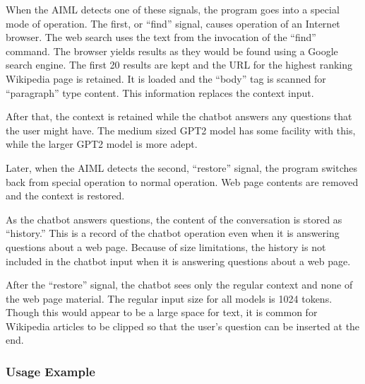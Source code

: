 When the AIML detects one of these signals, the program goes into a special mode of operation. The first, or ``find'' signal, causes operation of an Internet browser. The web search uses the text from the invocation of the ``find'' command. The browser yields results as they would be found using a Google search engine. The first 20 results are kept and the URL for the highest ranking Wikipedia page is retained. It is loaded and the ``body'' tag is scanned for ``paragraph'' type content. This information replaces the context input. 

After that, the context is retained while the chatbot answers any questions that the user might have. The medium sized GPT2 model has some facility with this, while the larger GPT2 model is more adept.

Later, when the AIML detects the second, ``restore'' signal, the program switches back from special operation to normal operation. Web page contents are removed and the context is restored. %

As the chatbot answers questions, the content of the conversation is stored as ``history.'' %
This is a record of the chatbot operation even when it is answering questions about a web page. %
Because of size limitations, the history is not included in the chatbot input when it is answering questions about a web page. %


After the ``restore'' signal, the chatbot sees only the regular context and none of the web page material. The regular input size for all models is 1024 tokens. %
Though this would appear to be a large space for text, it is common for Wikipedia articles to be clipped so that the user's question can be inserted at the end.

\subsubsection{Usage Example}

